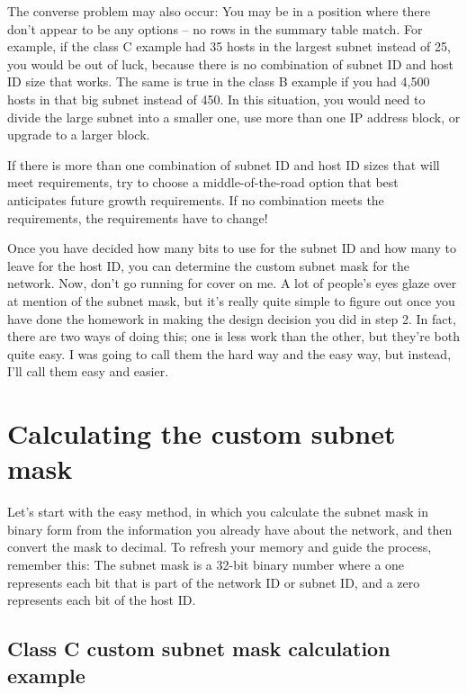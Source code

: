 The converse problem may also occur: You may be in a position where
there don't appear to be any options -- no rows in the summary table
match. For example, if the class C example had 35 hosts in the largest
subnet instead of 25, you would be out of luck, because there is no
combination of subnet ID and host ID size that works. The same is true
in the class B example if you had 4,500 hosts in that big subnet instead
of 450. In this situation, you would need to divide the large subnet
into a smaller one, use more than one IP address block, or upgrade to a
larger block.

 

\begin{keyconcept}
If there is more than one combination of subnet ID and host ID sizes that will meet requirements,
try to choose a middle-of-the-road option that best anticipates future growth requirements.
If no combination meets the requirements, the requirements have to change!
\end{keyconcept}
 

Once you have decided how many bits to use for the subnet ID and how
many to leave for the host ID, you can determine the custom subnet mask
for the network. Now, don't go running for cover on me. A lot of
people's eyes glaze over at mention of the subnet mask, but it's really
quite simple to figure out once you have done the homework in making the
design decision you did in step 2. In fact, there are two ways of doing
this; one is less work than the other, but they're both quite easy. I
was going to call them the hard way and the easy way, but instead, I'll
call them easy and easier.

\section{Calculating the custom subnet mask}

Let's start with the easy method, in which you calculate the subnet mask
in binary form from the information you already have about the network,
and then convert the mask to decimal. To refresh your memory and guide
the process, remember this: The subnet mask is a 32-bit binary number
where a one represents each bit that is part of the network ID or subnet
ID, and a zero represents each bit of the host ID.

\subsection{Class C custom subnet mask calculation example}

